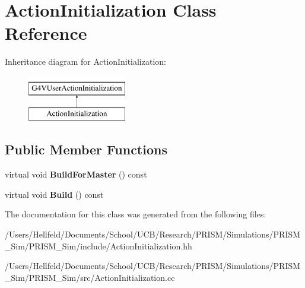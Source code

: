 \hypertarget{class_action_initialization}{}\section{Action\+Initialization Class Reference}
\label{class_action_initialization}
Inheritance diagram for Action\+Initialization\+:\begin{figure}[H]
\begin{center}
\leavevmode
\includegraphics[height=2.000000cm]{class_action_initialization}
\end{center}
\end{figure}
\subsection*{Public Member Functions}
\begin{DoxyCompactItemize}
\item 
\hypertarget{class_action_initialization_a48c24b5a340ef3e8a69f44f9b6bf02be}{}\label{class_action_initialization_a48c24b5a340ef3e8a69f44f9b6bf02be} 
virtual void {\bfseries Build\+For\+Master} () const
\item 
\hypertarget{class_action_initialization_a9b8f6328b1b2e3ba39a1c230774cab66}{}\label{class_action_initialization_a9b8f6328b1b2e3ba39a1c230774cab66} 
virtual void {\bfseries Build} () const
\end{DoxyCompactItemize}


The documentation for this class was generated from the following files\+:\begin{DoxyCompactItemize}
\item 
/\+Users/\+Hellfeld/\+Documents/\+School/\+U\+C\+B/\+Research/\+P\+R\+I\+S\+M/\+Simulations/\+P\+R\+I\+S\+M\+\_\+\+Sim/\+P\+R\+I\+S\+M\+\_\+\+Sim/include/Action\+Initialization.\+hh\item 
/\+Users/\+Hellfeld/\+Documents/\+School/\+U\+C\+B/\+Research/\+P\+R\+I\+S\+M/\+Simulations/\+P\+R\+I\+S\+M\+\_\+\+Sim/\+P\+R\+I\+S\+M\+\_\+\+Sim/src/Action\+Initialization.\+cc\end{DoxyCompactItemize}
